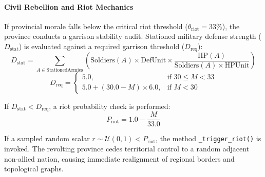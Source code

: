 \paragraph{Civil Rebellion and Riot Mechanics}
If provincial morale falls below the critical riot threshold ($\theta_{\text{riot}} = 33\%$), the province conducts a garrison stability audit. Stationed military defense strength ($D_{\text{stat}}$) is evaluated against a required garrison threshold ($D_{\text{req}}$):
\begin{equation}
    D_{\text{stat}} = \sum_{A \in \text{StationedArmies}} \left( \text{Soldiers}(A) \times \text{DefUnit} \times \frac{\text{HP}(A)}{\text{Soldiers}(A) \times \text{HPUnit}} \right)
\end{equation}
\begin{equation}
    D_{\text{req}} = \begin{cases}
        5.0, & \text{if } 30 \le M < 33 \\
        5.0 + (30.0 - M) \times 6.0, & \text{if } M < 30
    \end{cases}
\end{equation}

If $D_{\text{stat}} < D_{\text{req}}$, a riot probability check is performed:
\begin{equation}
    P_{\text{riot}} = 1.0 - \frac{M}{33.0}
\end{equation}

If a sampled random scalar $r \sim \mathcal{U}(0, 1) < P_{\text{riot}}$, the method \texttt{\_trigger\_riot()} is invoked. The revolting province cedes territorial control to a random adjacent non-allied nation, causing immediate realignment of regional borders and topological graphs.

